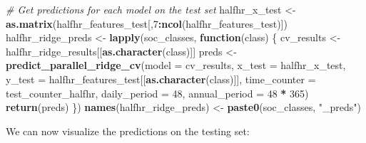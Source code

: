 \documentclass[
]{article}
\newenvironment{Shaded}{\begin{snugshade}}{\end{snugshade}}
\newcommand{\AttributeTok}[1]{\textcolor[rgb]{0.13,0.29,0.53}{#1}}
\newcommand{\CommentTok}[1]{\textcolor[rgb]{0.56,0.35,0.01}{\textit{#1}}}
\newcommand{\ControlFlowTok}[1]{\textcolor[rgb]{0.13,0.29,0.53}{\textbf{#1}}}
\newcommand{\DecValTok}[1]{\textcolor[rgb]{0.00,0.00,0.81}{#1}}
\newcommand{\FunctionTok}[1]{\textcolor[rgb]{0.13,0.29,0.53}{\textbf{#1}}}
\newcommand{\NormalTok}[1]{#1}
\newcommand{\OtherTok}[1]{\textcolor[rgb]{0.56,0.35,0.01}{#1}}
\newcommand{\SpecialCharTok}[1]{\textcolor[rgb]{0.81,0.36,0.00}{\textbf{#1}}}
\newcommand{\StringTok}[1]{\textcolor[rgb]{0.31,0.60,0.02}{#1}}
\begin{document}
\begin{Shaded}
\begin{Highlighting}[]
\CommentTok{\# Get predictions for each model on the test set}
\NormalTok{halfhr\_x\_test }\OtherTok{\textless{}{-}} \FunctionTok{as.matrix}\NormalTok{(halfhr\_features\_test[,}\DecValTok{7}\SpecialCharTok{:}\FunctionTok{ncol}\NormalTok{(halfhr\_features\_test)])}
\NormalTok{halfhr\_ridge\_preds }\OtherTok{\textless{}{-}} \FunctionTok{lapply}\NormalTok{(soc\_classes, }\ControlFlowTok{function}\NormalTok{(class) \{}
\NormalTok{  cv\_results }\OtherTok{\textless{}{-}}\NormalTok{ halfhr\_ridge\_results[[}\FunctionTok{as.character}\NormalTok{(class)]]}
\NormalTok{  preds }\OtherTok{\textless{}{-}} \FunctionTok{predict\_parallel\_ridge\_cv}\NormalTok{(}\AttributeTok{model =}\NormalTok{ cv\_results,}
                                     \AttributeTok{x\_test =}\NormalTok{ halfhr\_x\_test,}
                                     \AttributeTok{y\_test =}\NormalTok{ halfhr\_features\_test[[}\FunctionTok{as.character}\NormalTok{(class)]],}
                                     \AttributeTok{time\_counter =}\NormalTok{ test\_counter\_halfhr,}
                                     \AttributeTok{daily\_period =} \DecValTok{48}\NormalTok{,}
                                     \AttributeTok{annual\_period =} \DecValTok{48} \SpecialCharTok{*} \DecValTok{365}\NormalTok{)}
  \FunctionTok{return}\NormalTok{(preds)}
\NormalTok{\})}
\FunctionTok{names}\NormalTok{(halfhr\_ridge\_preds) }\OtherTok{\textless{}{-}} \FunctionTok{paste0}\NormalTok{(soc\_classes, }\StringTok{"\_preds"}\NormalTok{)}
\end{Highlighting}
\end{Shaded}

We can now visualize the predictions on the testing set:
\end{document}
